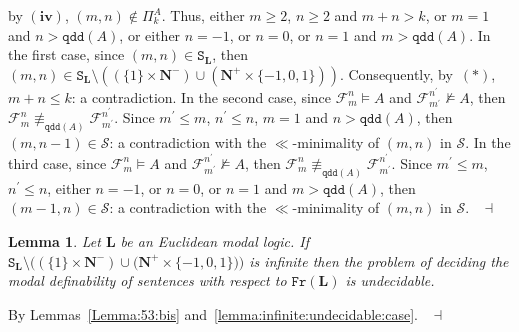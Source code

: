 \documentclass[draft]{article}
\newtheorem{lemma}{Lemma}
\newenvironment{proof}{{\bf Proof:}}{~$\dashv$\\}
\def\qdd{\mathtt{qdd}}
\def\Fr{\mathtt{Fr}}
\def\L{\mathbf{L}}
\begin{document}
\begin{proof}
by $\mathbf{(iv)}$, $(m,n){\not\in}\Pi_{k}^{A}$.
Thus, either $m{\geq}2$, $n{\geq}2$ and $m{+}n{>}k$, or $m{=}1$ and $n{>}\qdd(A)$, or either $n{=}{-}1$, or $n{=}0$, or $n{=}1$ and $m{>}\qdd(A)$.
In the first case, since $(m,n){\in}\mathtt{S}_{\L}$, then $(m,n){\in}\mathtt{S}_{\L}{\setminus}((\{1\}{\times}\mathbf{N}^{-}){\cup}(\mathbf{N}^{+}{\times}\{{-}1,0,1\}))$.
Consequently, by~$(\ast)$, $m{+}n{\leq}k$: a contradiction.
In the second case, since ${\mathcal F}_{m}^{n}{\models}A$ and ${\mathcal F}_{m^{\prime}}^{n^{\prime}}{\not\models}A$, then ${\mathcal F}_{m}^{n}{\not\equiv_{\qdd(A)}}{\mathcal F}_{m^{\prime}}^{n^{\prime}}$.
Since $m^{\prime}{\leq}m$, $n^{\prime}{\leq}n$, $m{=}1$ and $n{>}\qdd(A)$, then $(m,n{-}1){\in}{\mathcal S}$: a contradiction with the $\ll$-minimality of $(m,n)$ in ${\mathcal S}$.
In the third case, since ${\mathcal F}_{m}^{n}{\models}A$ and ${\mathcal F}_{m^{\prime}}^{n^{\prime}}{\not\models}A$, then ${\mathcal F}_{m}^{n}{\not\equiv_{\qdd(A)}}{\mathcal F}_{m^{\prime}}^{n^{\prime}}$.
Since $m^{\prime}{\leq}m$, $n^{\prime}{\leq}n$, either $n{=}{-}1$, or $n{=}0$, or $n{=}1$ and $m{>}\qdd(A)$, then $(m{-}1,n){\in}{\mathcal S}$: a contradiction with the $\ll$-minimality of $(m,n)$ in ${\mathcal S}$.
%
%
\medskip
%
%
\end{proof}
%
%
%
%
%
%
%
%
%
%
%
%
%
%
%
%
%
%
%
%
%
%
%
%
%
%
%
%
%
%
%
%
\begin{lemma}\label{proposition:undecidability:of:modal:definability}
%
%
Let $\L$ be an Euclidean modal logic.
If $\mathtt{S}_{\L}{\setminus}((\{1\}{\times}\mathbf{N}^{-}){\cup}(\mathbf{N}^{+}{\times}\{{-}1,
%
%
%
%
%
%
%
%
%
%
%
%
$\linebreak$
%
%
%
%
%
%
%
%
%
%
%
%
0,1\}))$ is infinite then the problem of deciding the modal definability of sentences with respect to $\Fr(\L)$ is undecidable.
%
%
\end{lemma}
%
%
\begin{proof}
%
%
By Lemmas~\ref{Lemma:53:bis} and~\ref{lemma:infinite:undecidable:case}.
%
%
\medskip
%
%
\end{proof}
\end{document}
